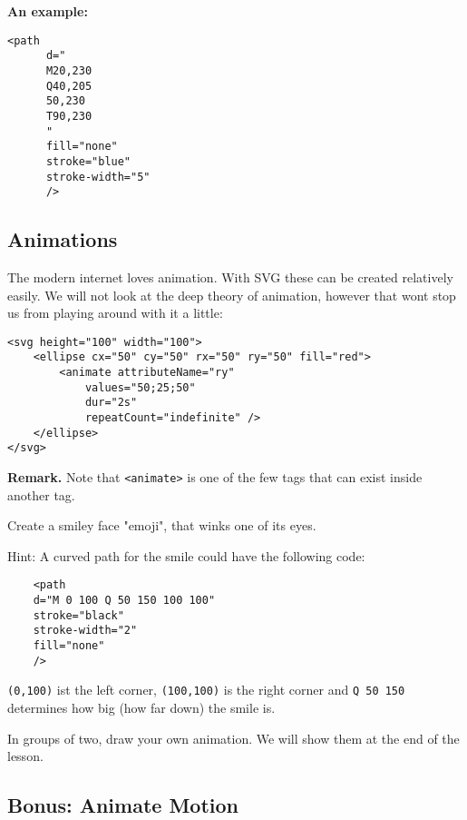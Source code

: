 \documentclass[11pt,a4paper]{report}
\begin{document}
{\bf An example:}
\begin{multicols}{2}
\begin{lstlisting}
<path 
      d="
      M20,230 
      Q40,205 
      50,230 
      T90,230
      " 
      fill="none" 
      stroke="blue" 
      stroke-width="5"
      />
\end{lstlisting}
\columnbreak

\end{multicols}

\newpage
\subsection{Animations}
The modern internet loves animation. With SVG these can be created relatively easily. We will not look at the deep theory of animation, however that wont stop us from playing around with it a little:

\begin{lstlisting}
<svg height="100" width="100">
    <ellipse cx="50" cy="50" rx="50" ry="50" fill="red">
        <animate attributeName="ry"
            values="50;25;50"
            dur="2s"
            repeatCount="indefinite" />
    </ellipse>
</svg>
\end{lstlisting}

{\bf Remark.} Note that \verb|<animate>| is one of the few tags that can exist inside another tag.

\begin{ex}
Create a smiley face "emoji", that winks one of its eyes.

Hint: A curved path for the smile could have the following code:
\begin{lstlisting}
    <path 
    d="M 0 100 Q 50 150 100 100" 
    stroke="black" 
    stroke-width="2" 
    fill="none"
    />
\end{lstlisting}
\verb|(0,100)| ist the left corner, \verb|(100,100)| is the right corner and \verb|Q 50 150| determines how big (how far down) the smile is.
\end{ex}

\begin{ex}
In groups of two, draw your own animation. We will show them at the end of the lesson.
\end{ex}

\newpage
\subsection{Bonus: Animate Motion}
\end{document}

